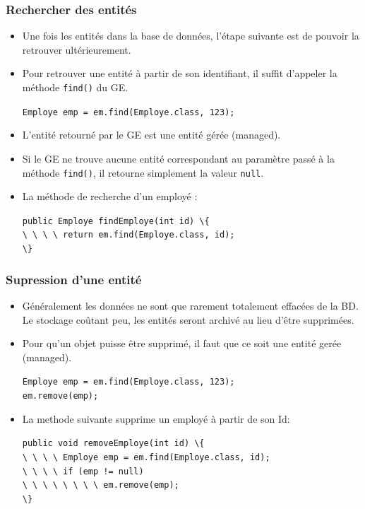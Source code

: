 \documentclass[xcolor=pdftex,x11names,table]{beamer}
\begin{document}
  \begin{frame}
    \frametitle{Rechercher des entités}
    \begin{itemize}
		  \item Une fois les entités dans la base de données, l'étape suivante est de pouvoir la retrouver ultérieurement.
		  \item Pour retrouver une entité à partir de son identifiant, il suffit d'appeler la méthode \texttt{find()} du GE. 
				\begin{block}{}
						\lstinline$Employe emp = em.find(Employe.class, 123);$\\
				\end{block}
			\item L'entité retourné par le GE est une entité gérée (managed).
			\item Si le GE ne trouve aucune entité correspondant au paramètre passé à la méthode \texttt{find()}, il retourne 
			simplement la valeur \texttt{null}.
			\item La méthode de recherche d'un employé :
				\begin{block}{}
					\lstinline$public Employe findEmploye(int id) \{$\\
					\lstinline$\ \ \ \ return em.find(Employe.class, id);$\\
					\lstinline$\}$\\
				\end{block}
		\end{itemize}
  \end{frame}
  \begin{frame}
    \frametitle{Supression d'une entité}
    \begin{itemize}
		  \item Généralement les données ne sont que rarement totalement effacées de la BD. Le stockage coûtant peu, 
		  les entités seront archivé au lieu d'être supprimées.
		  \item Pour qu'un objet puisse être supprimé, il faut que ce soit une entité gerée (managed).
		  	\begin{block}{}
						\lstinline$Employe emp = em.find(Employe.class, 123);$\\
						\lstinline$em.remove(emp);$\\
				\end{block}
		  \item La methode suivante supprime un employé à partir de son Id:
		  	\begin{block}{}
					\lstinline$public void removeEmploye(int id) \{$\\
					\lstinline$\ \ \ \ Employe emp = em.find(Employe.class, id);$\\
					\lstinline$\ \ \ \ if (emp != null)$\\
					\lstinline$\ \ \ \ \ \ \ \ em.remove(emp);$\\
					\lstinline$\}$\\
				\end{block}
		\end{itemize}
  \end{frame}
  
\end{document}
